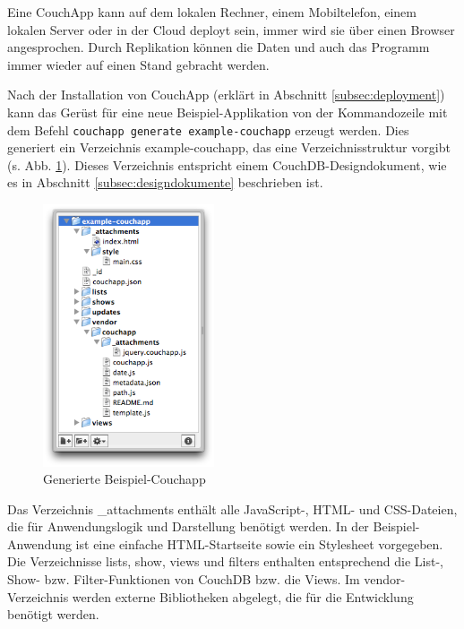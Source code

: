 Eine CouchApp kann auf dem lokalen Rechner, einem Mobiltelefon, einem lokalen Server oder in der Cloud deployt sein, immer wird sie über einen Browser angesprochen. Durch Replikation können die Daten und auch das Programm immer wieder auf einen Stand gebracht werden.

Nach der Installation von CouchApp (erklärt in Abschnitt \ref{subsec:deployment}) kann das Gerüst für eine neue Beispiel-Applikation von der Kommandozeile mit dem Befehl \lstinline!couchapp generate example-couchapp! erzeugt werden. Dies generiert ein Verzeichnis {\selectfont example-couchapp}, das eine Verzeichnisstruktur vorgibt (s. Abb. \ref{fig:example-couchapp}). Dieses Verzeichnis entspricht einem CouchDB-Designdokument, wie es in Abschnitt \ref{subsec:designdokumente} beschrieben ist.

\medskip
\begin{figure}[ht] 
 \begin{center}
   \includegraphics[width=0.45\textwidth]{grafik/example-couchapp} 
 \end{center}
 \caption{Generierte Beispiel-Couchapp}
 \label{fig:example-couchapp} 
\end{figure}

Das Verzeichnis {\selectfont \_attachments} enthält alle JavaScript-, HTML- und CSS-Dateien, die für Anwendungslogik und Darstellung benötigt werden. In der Beispiel-Anwendung ist eine einfache HTML-Startseite sowie ein Stylesheet vorgegeben. Die Verzeichnisse {\selectfont lists}, {\selectfont show}, {\selectfont views} und {\selectfont filters} enthalten entsprechend die List-, Show- bzw. Filter-Funktionen von CouchDB bzw. die Views. Im {\selectfont vendor}-Verzeichnis werden externe Bibliotheken abgelegt, die für die Entwicklung benötigt werden. 

